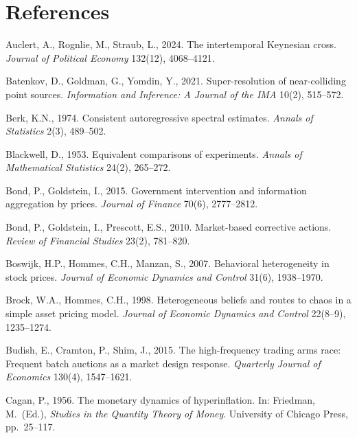 \documentclass[11pt,letterpaper]{article}
\theoremstyle{definition}
\begin{document}
\section*{References}
\begin{list}{}{\footnotesize\linespread{0.89}\selectfont\setlength{\leftmargin}{1.3em}\setlength{\itemindent}{-1.8em}\setlength{\itemsep}{0pt}\setlength{\parsep}{0pt}}

\item Auclert, A., Rognlie, M., Straub, L., 2024. The intertemporal Keynesian cross. \emph{Journal of Political Economy} 132(12), 4068--4121.

\item Batenkov, D., Goldman, G., Yomdin, Y., 2021. Super-resolution of near-colliding point sources. \emph{Information and Inference: A Journal of the IMA} 10(2), 515--572.

\item Berk, K.N., 1974. Consistent autoregressive spectral estimates. \emph{Annals of Statistics} 2(3), 489--502.

\item Blackwell, D., 1953. Equivalent comparisons of experiments. \emph{Annals of Mathematical Statistics} 24(2), 265--272.

\item Bond, P., Goldstein, I., 2015. Government intervention and information aggregation by prices. \emph{Journal of Finance} 70(6), 2777--2812.

\item Bond, P., Goldstein, I., Prescott, E.S., 2010. Market-based corrective actions. \emph{Review of Financial Studies} 23(2), 781--820.

\item Boswijk, H.P., Hommes, C.H., Manzan, S., 2007. Behavioral heterogeneity in stock prices. \emph{Journal of Economic Dynamics and Control} 31(6), 1938--1970.

\item Brock, W.A., Hommes, C.H., 1998. Heterogeneous beliefs and routes to chaos in a simple asset pricing model. \emph{Journal of Economic Dynamics and Control} 22(8--9), 1235--1274.

\item Budish, E., Cramton, P., Shim, J., 2015. The high-frequency trading arms race: Frequent batch auctions as a market design response. \emph{Quarterly Journal of Economics} 130(4), 1547--1621.

\item Cagan, P., 1956. The monetary dynamics of hyperinflation. In: Friedman, M.\ (Ed.), \emph{Studies in the Quantity Theory of Money}. University of Chicago Press, pp.\ 25--117.


\end{list}
\end{document}
